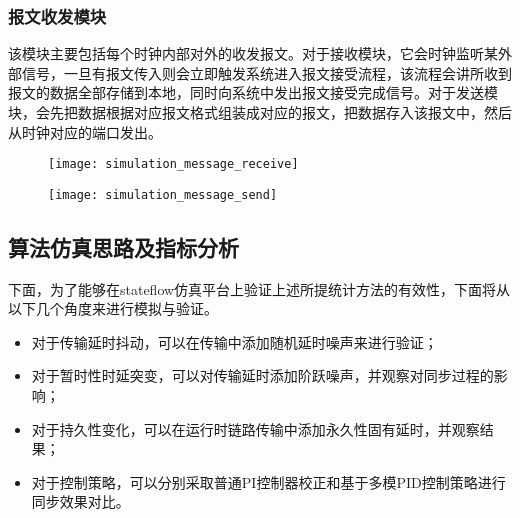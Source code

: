 \subsubsection{报文收发模块}
该模块主要包括每个时钟内部对外的收发报文。对于接收模块，它会时钟监听某外部信号，一旦有报文传入则会立即触发系统进入报文接受流程，该流程会讲所收到报文的数据全部存储到本地，同时向系统中发出报文接受完成信号。对于发送模块，会先把数据根据对应报文格式组装成对应的报文，把数据存入该报文中，然后从时钟对应的端口发出。
\begin{figure}[!hbp]
  \centering
  \begin{minipage}[b]{1\textwidth}
    \captionstyle{\centering}
    \centering
    \texttt{[image: simulation\_message\_receive]}
  \end{minipage}     
\end{figure}
\begin{figure}[!hbp]
  \centering
  \begin{minipage}[b]{1\textwidth}
    \captionstyle{\centering}
    \centering
    \texttt{[image: simulation\_message\_send]}
  \end{minipage}     
\end{figure}

\subsection{算法仿真思路及指标分析}
下面，为了能够在stateflow仿真平台上验证上述所提统计方法的有效性，下面将从以下几个角度来进行模拟与验证。
\begin{itemize}[noitemsep,topsep=0pt,parsep=0pt,partopsep=0pt]
  \item 对于传输延时抖动，可以在传输中添加随机延时噪声来进行验证；
  \item 对于暂时性时延突变，可以对传输延时添加阶跃噪声，并观察对同步过程的影响；
  \item 对于持久性变化，可以在运行时链路传输中添加永久性固有延时，并观察结果；
  \item 对于控制策略，可以分别采取普通PI控制器校正和基于多模PID控制策略进行同步效果对比。
\end{itemize}

